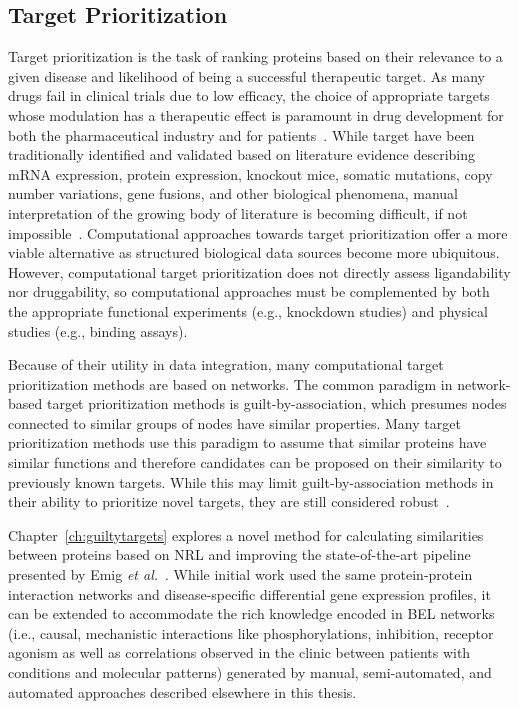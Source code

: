 \subsection{Target Prioritization}

Target prioritization is the task of ranking proteins based on their relevance to a given disease and likelihood of being a successful therapeutic target.
As many drugs fail in clinical trials due to low efficacy, the choice of appropriate targets whose modulation has a therapeutic effect is paramount in drug development for both the pharmaceutical industry and for patients~\cite{Arrowsmith2011,Arrowsmith2011a}.
While target have been traditionally identified and validated based on literature evidence describing mRNA expression, protein expression, knockout mice, somatic mutations, copy number variations, gene fusions, and other biological phenomena, manual interpretation of the growing body of literature is becoming difficult, if not impossible~\cite{Gashaw2012,Isik2015,Moseley2007}.
Computational approaches towards target prioritization offer a more viable alternative as structured biological data sources become more ubiquitous.
However, computational target prioritization does not directly assess ligandability nor druggability, so computational approaches must be complemented by both the appropriate functional experiments (e.g., knockdown studies) and physical studies (e.g., binding assays).

Because of their utility in data integration, many computational target prioritization methods are based on networks.
The common paradigm in network-based target prioritization methods is guilt-by-association, which presumes nodes connected to similar groups of nodes have similar properties.
Many target prioritization methods use this paradigm to assume that similar proteins have similar functions and therefore candidates can be proposed on their similarity to previously known targets.
While this may limit guilt-by-association methods in their ability to prioritize novel targets, they are still considered robust~\cite{Moreau2012}.

Chapter~\ref{ch:guiltytargets} explores a novel method for calculating similarities between proteins based on \ac{NRL} and improving the state-of-the-art pipeline presented by Emig \textit{et al.}~\cite{Emig2013}.
While initial work used the same protein-protein interaction networks and disease-specific differential gene expression profiles, it can be extended to accommodate the rich knowledge encoded in \ac{BEL} networks (i.e., causal, mechanistic interactions like phosphorylations, inhibition, receptor agonism as well as correlations observed in the clinic between patients with conditions and molecular patterns) generated by manual, semi-automated, and automated approaches described elsewhere in this thesis.

